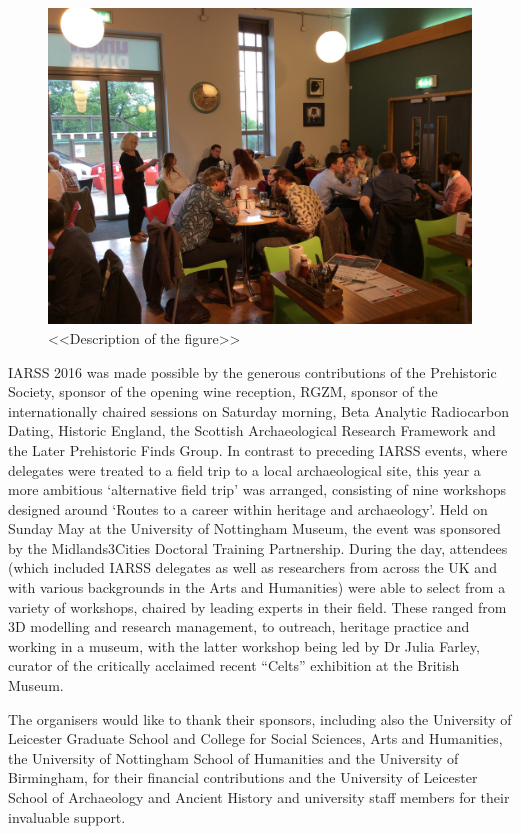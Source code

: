 \documentclass[ngerman,english]{ijsra}
\begin{document}
\begin{figure}[!b]
\includegraphics[width=\linewidth]{figures/IARSS_Quiz}
\caption{<<Description of the figure>>}
\label{fig:IARSS_Quiz}
\end{figure} 
IARSS 2016 was made possible by the generous contributions of the Prehistoric Society, sponsor of the opening wine reception, 
RGZM, 
sponsor of the internationally chaired sessions on Saturday morning, 
Beta Analytic Radiocarbon Dating, Historic England, the Scottish Archaeological Research Framework and the Later Prehistoric Finds Group. 
In contrast to preceding IARSS events, where delegates were treated to a field trip to a local archaeological site, this year a more ambitious ‘alternative field trip’ was arranged, consisting of nine workshops designed around ‘Routes to a career within heritage and archaeology’. 
Held on Sunday  May at the University of Nottingham Museum, the event was sponsored by the Midlands3Cities Doctoral Training Partnership. 
During the day, attendees (which included IARSS delegates as well as researchers from across the UK and with various backgrounds in the Arts and Humanities) were able to select from a variety of workshops, chaired by leading experts in their field. These ranged from 3D modelling and research management, to outreach, heritage practice and working in a museum, with the latter workshop being led by Dr Julia Farley, curator of the critically acclaimed recent \enquote{Celts} exhibition at the British Museum.

The organisers would like to thank their sponsors, including also the University of Leicester Graduate School and College for Social Sciences, Arts and Humanities, the University of Nottingham School of Humanities and the University of Birmingham, for their financial contributions and the University of Leicester School of Archaeology and Ancient History and university staff members for their invaluable support. 



\IJSRAclosing%
\end{document}
